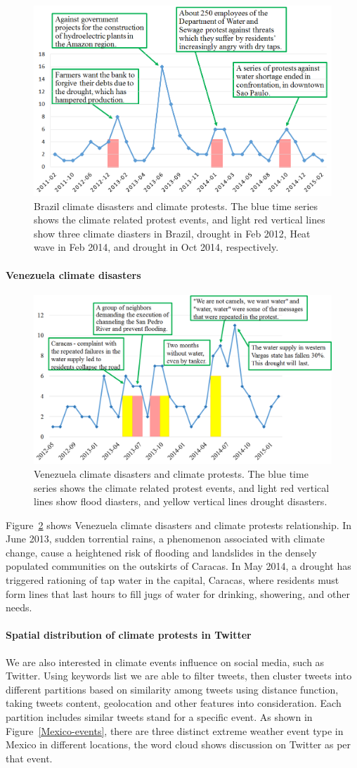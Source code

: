 \documentclass[9pt,twocolumn,twoside]{pnas-new}
\begin{document}
\begin{figure}[ht]
\centerline
{\includegraphics[width=.35\textwidth]{figures/Brazil_disaster1}}
\caption{Brazil climate disasters and climate protests. The blue time series shows the climate related protest events, and light red vertical lines show three climate diasters in Brazil, drought in Feb 2012, Heat wave in Feb 2014, and drought in Oct 2014, respectively.}
\label{Brazil_disaster_timeseries}
\end{figure}


\paragraph{Venezuela climate disasters}

\begin{figure}[ht]
\centerline
{\includegraphics[width=.4\textwidth]{figures/Venezuela_disaster}}
\caption{Venezuela climate disasters and climate protests. The blue time series shows the climate related protest events, and light red vertical lines show flood diasters, and yellow vertical lines drought disasters.}
\label{Venezuela_disaster_timeseries}
\end{figure}


Figure~\ref{Venezuela_disaster_timeseries} shows Venezuela climate disasters and climate protests relationship. In June 2013, sudden torrential rains, a phenomenon associated with climate change, cause a heightened risk of flooding and landslides in the densely populated communities on the outskirts of Caracas. In May 2014, a drought has triggered rationing of tap water in the capital, Caracas, where residents must form lines that last hours to fill jugs of water for drinking, showering, and other needs.

\paragraph{Spatial distribution of climate protests in Twitter}
We are also interested in climate events influence on social media, such as Twitter. Using keywords list we are able to filter tweets, then cluster tweets into different partitions based on similarity among tweets using distance function, taking tweets content, geolocation and other features into consideration. Each partition includes similar tweets stand for a specific event. As shown in Figure~\ref{Mexico-events}, there are three distinct extreme weather event type in Mexico in different locations, the word cloud shows discussion on Twitter as per that event.
\end{document}
